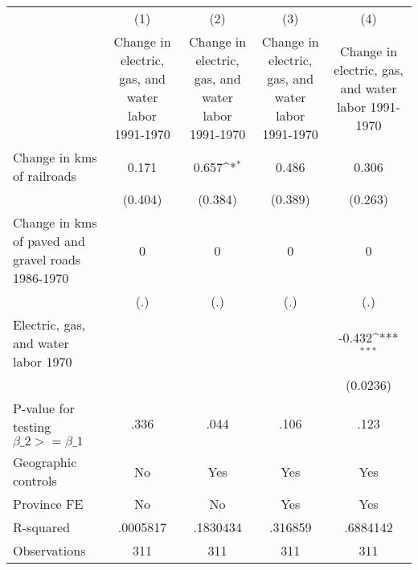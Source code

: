 {
\def\sym#1{\ifmmode^{#1}\else\(^{#1}\)\fi}
\begin{tabular}{l*{4}{c}}
\hline\hline
                &\multicolumn{1}{c}{(1)}&\multicolumn{1}{c}{(2)}&\multicolumn{1}{c}{(3)}&\multicolumn{1}{c}{(4)}\\
                &\multicolumn{1}{c}{Change in electric, gas, and water labor 1991-1970}&\multicolumn{1}{c}{Change in electric, gas, and water labor 1991-1970}&\multicolumn{1}{c}{Change in electric, gas, and water labor 1991-1970}&\multicolumn{1}{c}{Change in electric, gas, and water labor 1991-1970}\\
\hline
Change in kms of railroads&    0.171         &    0.657\sym{*}  &    0.486         &    0.306         \\
                &  (0.404)         &  (0.384)         &  (0.389)         &  (0.263)         \\
[1em]
Change in kms of paved and gravel roads 1986-1970&        0         &        0         &        0         &        0         \\
                &      (.)         &      (.)         &      (.)         &      (.)         \\
[1em]
Electric, gas, and water labor 1970&                  &                  &                  &   -0.432\sym{***}\\
                &                  &                  &                  & (0.0236)         \\
\hline
P-value for testing $\beta\_{2} >= \beta\_{1}$&     .336         &     .044         &     .106         &     .123         \\
Geographic controls&       No         &      Yes         &      Yes         &      Yes         \\
Province FE     &       No         &       No         &      Yes         &      Yes         \\
R-squared       & .0005817         & .1830434         &  .316859         & .6884142         \\
Observations    &      311         &      311         &      311         &      311         \\
\hline\hline
\end{tabular}
}
